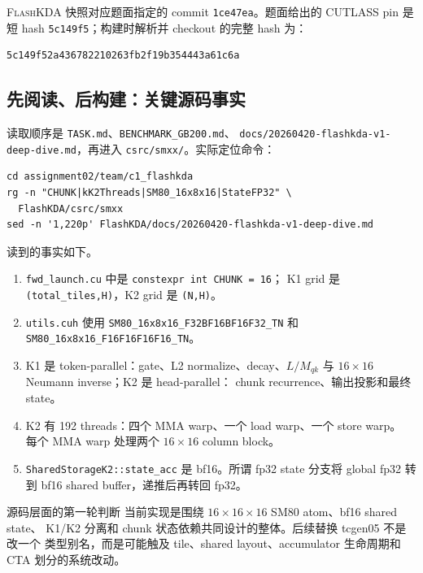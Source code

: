 \documentclass[11pt,a4paper,fontset=none]{ctexart}
\newcommand{\FlashKDA}{\textsc{FlashKDA}}
\newcommand{\code}[1]{\texttt{#1}}
\begin{document}
\FlashKDA{} 快照对应题面指定的 commit \code{1ce47ea}。题面给出的 CUTLASS
pin 是短 hash \code{5c149f5}；构建时解析并 checkout 的完整 hash 为：

\begin{lstlisting}
5c149f52a436782210263fb2f19b354443a61c6a
\end{lstlisting}

\subsection{先阅读、后构建：关键源码事实}

读取顺序是 \code{TASK.md}、\code{BENCHMARK\_GB200.md}、
\code{docs/20260420-flashkda-v1-deep-dive.md}，再进入
\code{csrc/smxx/}。实际定位命令：

\begin{lstlisting}
cd assignment02/team/c1_flashkda
rg -n "CHUNK|kK2Threads|SM80_16x8x16|StateFP32" \
  FlashKDA/csrc/smxx
sed -n '1,220p' FlashKDA/docs/20260420-flashkda-v1-deep-dive.md
\end{lstlisting}

读到的事实如下。

\begin{enumerate}
  \item \code{fwd\_launch.cu} 中是 \code{constexpr int CHUNK = 16}；
        K1 grid 是 \code{(total\_tiles,H)}，K2 grid 是 \code{(N,H)}。
  \item \code{utils.cuh} 使用
        \code{SM80\_16x8x16\_F32BF16BF16F32\_TN} 和
        \code{SM80\_16x8x16\_F16F16F16F16\_TN}。
  \item K1 是 token-parallel：gate、L2 normalize、decay、\(L/M_{qk}\)
        与 \(16\times16\) Neumann inverse；K2 是 head-parallel：
        chunk recurrence、输出投影和最终 state。
  \item K2 有 192 threads：四个 MMA warp、一个 load warp、一个 store warp。
        每个 MMA warp 处理两个 \(16\times16\) column block。
  \item \code{SharedStorageK2::state\_acc} 是 bf16。所谓 fp32 state
        分支将 global fp32 转到 bf16 shared buffer，递推后再转回 fp32。
\end{enumerate}

\begin{decision}{源码层面的第一轮判断}
当前实现是围绕 \(16\times16\times16\) SM80 atom、bf16 shared state、
K1/K2 分离和 chunk 状态依赖共同设计的整体。后续替换 tcgen05 不是改一个
类型别名，而是可能触及 tile、shared layout、accumulator 生命周期和 CTA
划分的系统改动。
\end{decision}
\end{document}

